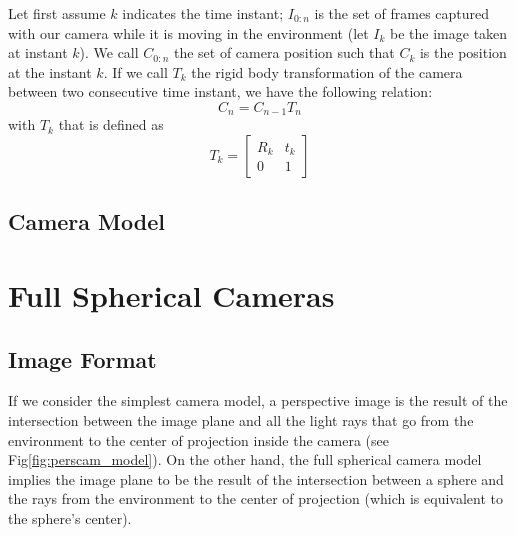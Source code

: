 Let first assume \(k\) indicates the time instant; 
\(I_{0:n} \) is the set of frames 
captured with our camera while it is moving in the environment (let \(I_{k}\) 
be the image taken at instant \(k\)). We call \(C_{0:n}\) the set of camera 
position such that \(C_k\) is the position at the instant \(k\).
If we call \(T_k\) the rigid body transformation of the camera between two
consecutive time instant, we have the following relation:
\begin{equation*}
C_n = C_{n-1} T_n
\end{equation*}
\noindent with \(T_k\) that is defined as
\begin{equation*}
	T_k =
	\begin{bmatrix}
	R_k & t_k \\
	0 & 1
	\end{bmatrix}
\end{equation*}

\subsection{Camera Model}

\section{Full Spherical Cameras}
\subsection{Image Format}
If we consider the simplest camera model, 
a perspective image is the result of the intersection between the image plane 
and all the light rays that go from the environment to the center of 
projection inside the camera (see Fig\ref{fig:perscam_model}).
\label{fig:perscam_model}
On the other hand, the full spherical camera model implies the image plane 
to be the result of the intersection between a sphere and the rays from the 
environment to the center of projection (which is equivalent to the sphere's 
center).

